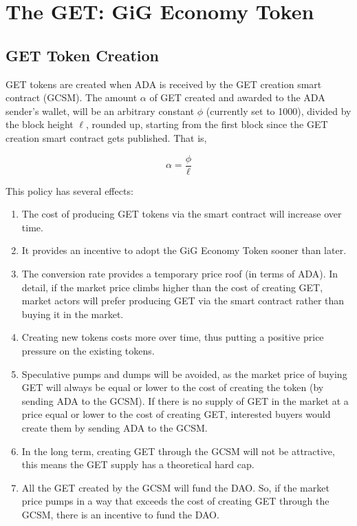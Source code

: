 \documentclass{article}
\begin{document}
\section{The GET: GiG Economy Token}


\subsection{GET Token Creation}
GET tokens are created when ADA is received by the GET creation smart contract (GCSM).
The amount $\alpha$ of GET created and awarded to the ADA sender's wallet, will be an arbitrary constant $\phi$ (currently set to 1000), divided by the block height $\ell$, rounded up, starting from the first block since the GET creation smart contract gets published. That is,

\[ \alpha
  = \dfrac{\phi}{\ell}
\]

This policy has several effects:

\begin{enumerate}

  \item The cost of producing GET tokens via the smart contract will increase over time.
  \item It provides an incentive to adopt the GiG Economy Token sooner than later.
  \item The conversion rate provides a temporary price roof (in terms of ADA). In detail, if the market price climbs higher than the cost of creating GET, market actors will prefer producing GET via the smart contract rather than buying it in the market.
  \item Creating new tokens costs more over time, thus putting a positive price pressure on the existing tokens.
  \item Speculative pumps and dumps will be avoided, as the market price of buying GET will always be equal or lower to the cost of creating the token (by sending ADA to the GCSM). If there is no supply of GET in the market at a price equal or lower to the cost of creating GET, interested buyers would create them by sending ADA to the GCSM.
  \item In the long term, creating GET through the GCSM will not be attractive, this means the GET supply has a theoretical hard cap.
  \item All the GET created by the GCSM will fund the DAO. So, if the market price pumps in a way that exceeds the cost of creating GET through the GCSM, there is an incentive to fund the DAO.
\end{enumerate}
\end{document}
